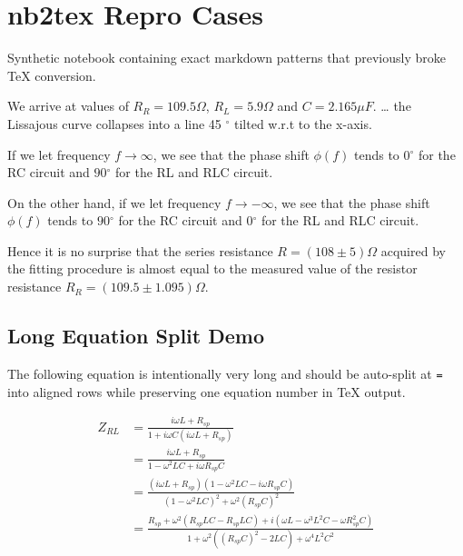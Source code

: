 \documentclass{article}
\begin{document}
\section{nb2tex Repro Cases}

Synthetic notebook containing exact markdown patterns that previously
broke TeX conversion.

We arrive at values of \(R_R = 109.5\Omega\), \(R_L = 5.9\Omega\) and
\(C = 2.165 \mu F\). \ldots{} the Lissajous curve collapses into a line
45 \(\ensuremath{^\circ}\) tilted w.r.t to the x-axis.

If we let frequency \(f \to \infty\), we see that the phase shift
\(\phi(f)\) tends to \(0 \ensuremath{^\circ}\) for the RC circuit and
\(90 \ensuremath{^\circ}\) for the RL and RLC circuit.

On the other hand, if we let frequency \(f \to -\infty\), we see that
the phase shift \(\phi(f)\) tends to \(90 \ensuremath{^\circ}\) for the
RC circuit and \(0 \ensuremath{^\circ}\) for the RL and RLC circuit.

Hence it is no surprise that the series resistance
\(R = (108 \pm 5) \Omega\) acquired by the fitting procedure is almost
equal to the measured value of the resistor
resistance \(R_R=(109.5 \pm 1.095) \Omega\).

\subsection{Long Equation Split Demo}

The following equation is intentionally very long and should be
auto-split at \texttt{=} into aligned rows while preserving one equation
number in TeX output.


\begin{equation}
\begin{aligned}
Z_{RL} &= \frac{i\omega L+R_{sp}}{1+i \omega C(i\omega L+R_{sp})} \\
&= \frac{i\omega L+R_{sp}}{1 - \omega^2LC + i \omega R_{sp}C} \\
&= \frac{(i\omega L+R_{sp})(1 - \omega^2LC - i \omega R_{sp}C)}{(1 - \omega^2LC)^2 + \omega^2 (R_{sp}C)^2} \\
&= \frac{R_{sp}+\omega^2 (R_{sp}LC-R_{sp}LC) + i\left( \omega L - \omega^3L^2C - \omega R_{sp}^2C\right)}{1 + \omega^2 \left((R_{sp}C)^2- 2LC \right)+ \omega^4L^2C^2}
\end{aligned}
\label{nb2tex:eq:1}
\end{equation}
\end{document}
